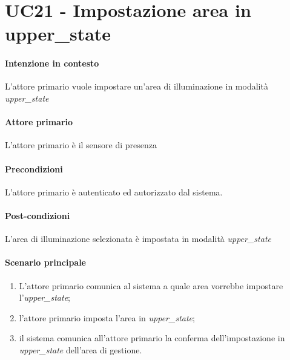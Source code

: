 \section{UC21 - Impostazione area in upper\_state}\label{uc:21}
\paragraph{Intenzione in contesto} L'attore primario vuole impostare un'area di illuminazione in modalità \textit{upper\_state}
\paragraph{Attore primario} L'attore primario è il sensore di presenza
\paragraph{Precondizioni} L'attore primario è autenticato ed autorizzato dal sistema.
\paragraph{Post-condizioni} L'area di illuminazione selezionata è impostata in modalità \textit{upper\_state}
\paragraph{Scenario principale}
\begin{enumerate}
    \item L'attore primario comunica al sistema a quale area vorrebbe impostare l'\textit{upper\_state};
    \item l'attore primario imposta l'area in \textit{upper\_state};
    \item il sistema comunica all'attore primario la conferma dell'impostazione in \textit{upper\_state} dell'area di gestione.
\end{enumerate}